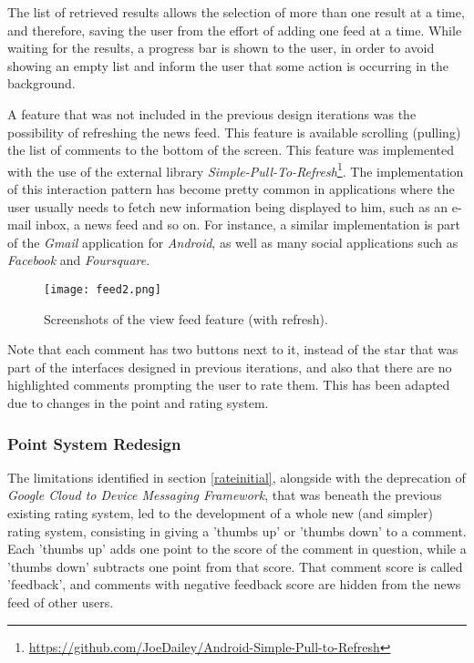 The list of retrieved results allows the selection of more than one result at a time, and therefore, saving the user from the effort of adding one feed at a time.
While waiting for the results, a progress bar is shown to the user, in order to avoid showing an empty list and inform the user that some action is occurring in the background.

A feature that was not included in the previous design iterations was the possibility of refreshing the news feed. This feature is available scrolling (pulling) the list of comments to the bottom of the screen. This feature was implemented with the use of the external library \emph{Simple-Pull-To-Refresh}\footnote{\url{https://github.com/JoeDailey/Android-Simple-Pull-to-Refresh}}. The implementation of this interaction pattern has become pretty common in applications where the user usually needs to fetch new information being displayed to him, such as an e-mail inbox, a news feed and so on. For instance, a similar implementation is part of the \emph{Gmail} application for \emph{Android}, as well as many social applications such as \emph{Facebook} and \emph{Foursquare}. 

\begin{figure}[!h]
  \begin{center}
    \leavevmode
    \texttt{[image: feed2.png]}
    \caption{Screenshots of the view feed feature (with refresh).}
    \label{fig:feed2}
  \end{center}
\end{figure}


Note that each comment has two buttons next to it, instead of the star that was part of the interfaces designed in previous iterations, and also that there are no highlighted comments prompting the user to rate them. This has been adapted due to changes in the point and rating system.

\subsubsection{Point System Redesign}\label{points}

The limitations identified in section \ref{rateinitial}, alongside with the deprecation of \emph{Google Cloud to Device Messaging Framework}, that was beneath the previous existing rating system, led to the development of a whole new (and simpler) rating system, consisting in giving a 'thumbs up' or 'thumbs down' to a comment. Each 'thumbs up' adds one point to the score of the comment in question, while a 'thumbs down' subtracts one point from that score. That comment score is called 'feedback', and comments with negative feedback score are hidden from the news feed of other users. 

